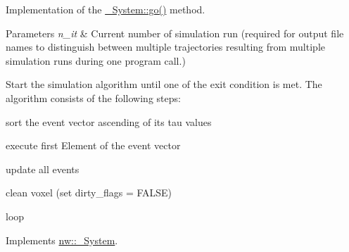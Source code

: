 Implementation of the \hyperlink{classnw_1_1___system_ae0276aebba39a971d6e240a86a389713}{\+\_\+\+System\+::go()} method. 


\begin{DoxyParams}{Parameters}
{\em n\+\_\+it} & Current number of simulation run (required for output file names to distinguish between multiple trajectories resulting from multiple simulation runs during one program call.)\\
\hline
\end{DoxyParams}
Start the simulation algorithm until one of the exit condition is met. The algorithm consists of the following steps\+:
\begin{DoxyEnumerate}
\item sort the event vector ascending of its tau values
\item execute first Element of the event vector
\item update all events
\item clean voxel (set dirty\+\_\+flags = {\ttfamily F\+A\+L\+S\+E})
\item loop 
\end{DoxyEnumerate}

Implements \hyperlink{classnw_1_1___system_ae0276aebba39a971d6e240a86a389713}{nw\+::\+\_\+\+System}.


